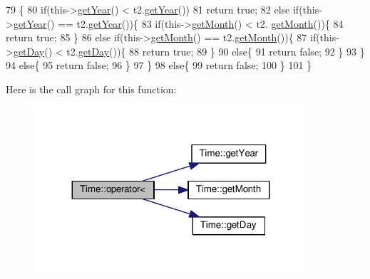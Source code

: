 \begin{DoxyCode}
79                              \{
80     \textcolor{keywordflow}{if}(this->\hyperlink{classTime_ade4d01d38041bb86a2e1ded9fd3cd28e}{getYear}() < t2.\hyperlink{classTime_ade4d01d38041bb86a2e1ded9fd3cd28e}{getYear}())
81         \textcolor{keywordflow}{return} \textcolor{keyword}{true};
82     \textcolor{keywordflow}{else} \textcolor{keywordflow}{if}(this->\hyperlink{classTime_ade4d01d38041bb86a2e1ded9fd3cd28e}{getYear}() == t2.\hyperlink{classTime_ade4d01d38041bb86a2e1ded9fd3cd28e}{getYear}())\{
83         \textcolor{keywordflow}{if}(this->\hyperlink{classTime_a22fd86b14d3b067cf1447fd9ca5caf6f}{getMonth}() < t2. \hyperlink{classTime_a22fd86b14d3b067cf1447fd9ca5caf6f}{getMonth}())\{
84             \textcolor{keywordflow}{return} \textcolor{keyword}{true};
85         \}
86         \textcolor{keywordflow}{else} \textcolor{keywordflow}{if}(this->\hyperlink{classTime_a22fd86b14d3b067cf1447fd9ca5caf6f}{getMonth}() == t2.\hyperlink{classTime_a22fd86b14d3b067cf1447fd9ca5caf6f}{getMonth}())\{
87             \textcolor{keywordflow}{if}(this->\hyperlink{classTime_abdccc37217b520155a67a1d732014f1a}{getDay}() < t2.\hyperlink{classTime_abdccc37217b520155a67a1d732014f1a}{getDay}())\{
88                 \textcolor{keywordflow}{return} \textcolor{keyword}{true};
89             \}
90             \textcolor{keywordflow}{else}\{
91                 \textcolor{keywordflow}{return} \textcolor{keyword}{false};
92             \}
93         \}
94         \textcolor{keywordflow}{else}\{
95             \textcolor{keywordflow}{return} \textcolor{keyword}{false};
96         \}
97     \}
98     \textcolor{keywordflow}{else}\{
99     \textcolor{keywordflow}{return} \textcolor{keyword}{false};
100     \}
101 \}
\end{DoxyCode}


Here is the call graph for this function\+:\nopagebreak
\begin{figure}[H]
\begin{center}
\leavevmode
\includegraphics[width=287pt]{classTime_a36e9d3c27e0f42d2d83f9831dcc4a670_cgraph}
\end{center}
\end{figure}


